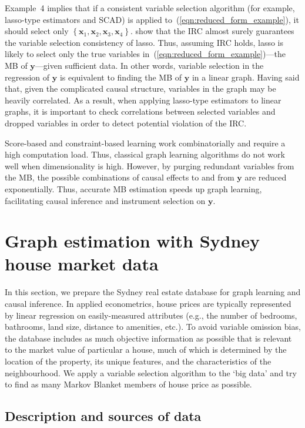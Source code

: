 \documentclass[11pt,review,authoryear]{elsarticle}
\begin{document}
\bigskip
Example~4 implies that if a consistent variable selection algorithm (for example, lasso-type estimators and SCAD) is applied to~(\ref{eqn:reduced_form_example}), it should select only $\left\{ \mathbf{x}_1, \mathbf{x}_2, \mathbf{x}_3, \mathbf{x}_4 \right\}$. \citet{zhaoyu06} show that the IRC almost surely guarantees the variable selection consistency of lasso. Thus, assuming IRC holds, lasso is likely to select only the true variables in~(\ref{eqn:reduced_form_example})---the MB of $\mathbf{y}$---given sufficient data. In other words, variable selection in the regression of $\mathbf{y}$ is equivalent to finding the MB of $\mathbf{y}$ in a linear graph. Having said that, given the complicated causal structure, variables in the graph may be heavily correlated. As a result, when applying lasso-type estimators to linear graphs, it is important to check correlations between selected variables and dropped variables in order to detect potential violation of the IRC.

Score-based and constraint-based learning work combinatorially and require a high computation load. Thus, classical graph learning algorithms do not work well when dimensionality is high. However, by purging redundant variables from the MB, the possible combinations of causal effects to and from $\mathbf{y}$ are reduced exponentially. Thus, accurate MB estimation speeds up graph learning, facilitating causal inference and instrument selection on $\mathbf{y}$.

\section{Graph estimation with Sydney house market data \label{section:estimation}}

In this section, we prepare the Sydney real estate database for graph learning and causal inference. In applied econometrics, house prices are typically represented by linear regression on easily-measured attributes (e.g., the number of bedrooms, bathrooms, land size, distance to amenities, etc.). To avoid variable omission bias, the database includes as much objective information as possible that is relevant to the market value of particular a house, much of which is determined by the location of the property, its unique features, and the characteristics of the neighbourhood. We apply a variable selection algorithm to the `big data' and try to find as many Markov Blanket members of house price as possible.

\subsection{Description and sources of data}
\end{document}
